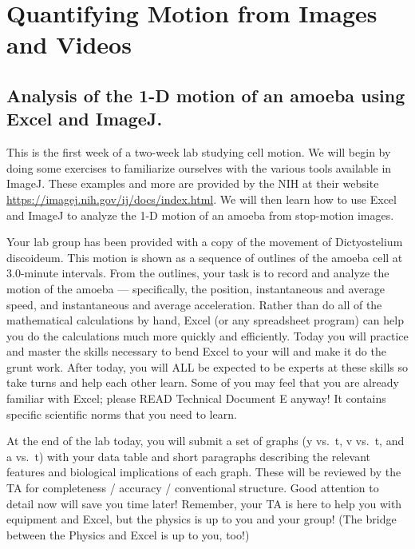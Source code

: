 \chapter{Quantifying Motion from Images and Videos}
\thispagestyle{fancy}
\section{Analysis of the 1-D motion of an amoeba using Excel and ImageJ.}
This is the first week of a two-week lab studying cell motion.
We will begin by doing some exercises to familiarize ourselves with the various tools available in ImageJ.
These examples and more are provided by the NIH at their website \url{https://imagej.nih.gov/ij/docs/index.html}.
We will then learn how to use Excel and ImageJ to analyze the 1-D motion of an amoeba from stop-motion images.
\par
Your lab group has been provided with a copy of the movement of Dictyostelium discoideum.
This motion is shown as a sequence of outlines of the amoeba cell at 3.0-minute intervals.
From the outlines, your task is to record and analyze the motion of the amoeba — specifically, the position, instantaneous and average speed, and instantaneous and average acceleration.
Rather than do all of the mathematical calculations by hand, Excel (or any spreadsheet program) can help you do the calculations much more quickly and efficiently.
Today you will practice and master the skills necessary to bend Excel to your will and make it do the grunt work.
After today, you will ALL be expected to be experts at these skills so take turns and help each other learn.
Some of you may feel that you are already familiar with Excel; please READ Technical Document E anyway!
It contains specific scientific norms that you need to learn.
\par
At the end of the lab today, you will submit a set of graphs (y vs.\ t, v vs.\ t, and a vs.\ t) with your data table and short paragraphs describing the relevant features and biological implications of each graph.
These will be reviewed by the TA for completeness / accuracy / conventional structure.
Good attention to detail now will save you time later!
Remember, your TA is here to help you with equipment and Excel, but the physics is up to you and your group!
(The bridge between the Physics and Excel is up to you, too!)

